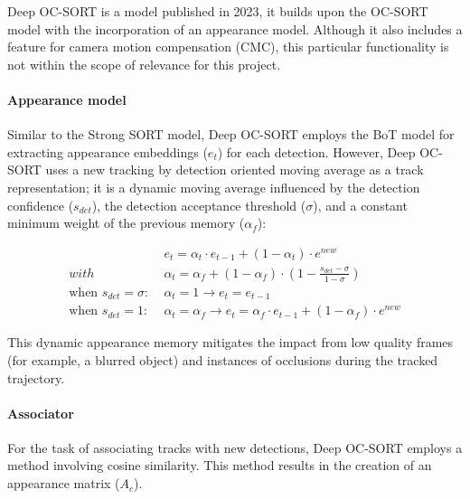 
{
    Deep OC-SORT\cite{maggiolino2023deep} is a model published in 2023, 
    it builds upon the \ac{OC-SORT} model with the incorporation of an appearance model. 
    Although it also includes a feature for camera motion compensation (CMC), 
    this particular functionality is not within the scope of relevance for this project.
}

\paragraph{Appearance model}

{
    Similar to the Strong SORT model, Deep OC-SORT employs the \ac{BoT} model for extracting appearance embeddings ($e_{t}$) for each detection.
    However, Deep OC-SORT uses a new tracking by detection oriented moving average as a track representation; 
    it is a dynamic moving average influenced by the detection confidence ($s_{det}$), the detection acceptance threshold ($\sigma$), and a constant minimum weight of the previous memory ($\alpha_{f}$):
}

\begin{equation}
    \label{eqn:dynamic exponential moving average}
    \begin{split}
        &e_{t} = \alpha_{t} \cdot e_{t-1} + (1 - \alpha_{t}) \cdot e^{new} \\[0.25cm]
        with \;& \alpha_{t} = \alpha_{f} + (1 - \alpha_{f}) \cdot \left(1 - \frac{s_{det} - \sigma}{1 - \sigma}\right) \\[0.25cm]
        \text{when } s_{det} = \sigma : \;& \alpha_{t} = 1 \rightarrow e_{t} = e_{t-1} \\[0.25cm]
        \text{when } s_{det} = 1 : \;& \alpha_{t} = \alpha_{f} \rightarrow e_{t} = \alpha_{f} \cdot e_{t-1} + (1 - \alpha_{f}) \cdot e^{new}
    \end{split}
\end{equation}

{
    This dynamic appearance memory mitigates the impact from low quality frames (for example, a blurred object) and instances of occlusions during the tracked trajectory.
}

\paragraph{Associator}

{
    For the task of associating tracks with new detections, Deep OC-SORT employs a method involving cosine similarity. 
    This method results in the creation of an appearance matrix ($A_{c}$). 
}


